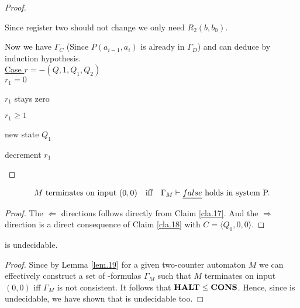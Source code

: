 \begin{proof}
	\begin{figure}[H]
		
	\end{figure}
	Since register two should not change we only need $R_2(b,b_0)$.
	
	\begin{figure}[H]
		
	\end{figure}
	Now we have $\Gamma_C$ (Since $P(a_{i-1},a_i)$ is already in $\Gamma_D$) and can deduce \false{} by induction hypothesis.\\
	\underline{Case $r=-(Q,1,Q_1,Q_2)$}
	\\\uline{$r_1=0$}
	
	\begin{figure}[H]
		
	\end{figure}
	
	$r_1$ stays zero
	
	\begin{figure}[H]
		
	\end{figure}
	\uline{$r_1\geq1$}
	
	new state $Q_1$
	
	\begin{figure}[H]
		
	\end{figure}
	
	decrement $r_1$
	
	\begin{figure}[H]
		
	\end{figure}
	
\end{proof}

\begin{lemma}\label{lem.19}
	\begin{align*} %
		  & \text{$M$ terminates on input $(0,0)$} &   & \text{iff} & \text{$\Gamma_M\vdash\false$ holds in system P.} 
	\end{align*}
\end{lemma}
\begin{proof}
	The $\Leftarrow$ directions follows directly from Claim \ref{cla.17}. And the $\Rightarrow$ direction is a direct consequence of Claim \ref{cla.18} with $C=\langle Q_0,0,0\rangle$.
\end{proof}

\begin{theorem}
	\PCons{} is undecidable.
\end{theorem}
\begin{proof}
	Since by Lemma \ref{lem.19} for a given two-counter automaton $M$ we can effectively construct a set of \SysP-formulas $\Gamma_M$ such that $M$ terminates on input $(0,0)$ iff $\Gamma_M$ is not consistent. It follows that $\textbf{HALT}\leq\textbf{CONS}$. Hence, since \autHalt{} is undecidable, we have shown that \PCons{} is undecidable too.
\end{proof}
